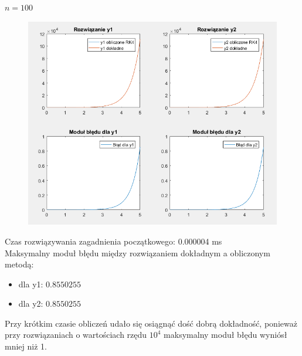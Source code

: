 \documentclass[12pt]{article}
\begin{document}
\begin{enumerate}[label=\textbf{Przykład \arabic*}]
		$n = 100$
		
		\begin{figure}[H]
			\centering
			\includegraphics[scale=0.7]{images/example-3.png}
		\end{figure}
		
		
		Czas rozwiązywania zagadnienia początkowego: 0.000004 ms\\
		Maksymalny moduł błędu między rozwiązaniem dokładnym a obliczonym metodą:
		\begin{itemize}
			\item dla y1: $0.8550255$
			\item dla y2: $0.8550255$
		\end{itemize}
	
		Przy krótkim czasie obliczeń udało się osiągnąć dość dobrą dokładność, ponieważ przy rozwiązaniach o wartościach rzędu $10^4$ maksymalny moduł błędu wyniósł mniej niż 1.
		
	\end{enumerate}
	
	
	
	
\end{document}

